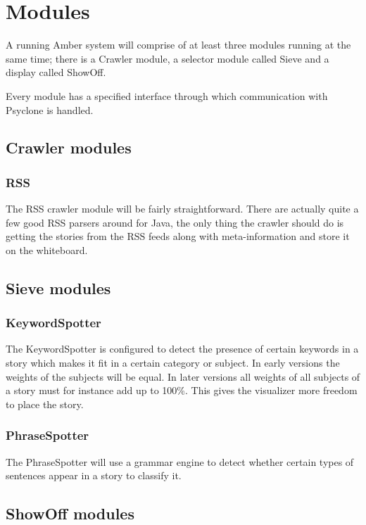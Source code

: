 \section{\label{sct:modules}Modules}

A running Amber system will comprise of at least three modules running at the
same time; there is a Crawler module, a selector module called Sieve and a
display called ShowOff.

Every module has a specified interface through which communication with
Psyclone is handled.

\subsection{Crawler modules}

\subsubsection{RSS}

The RSS crawler module will be fairly straightforward. There are actually quite
a few good RSS parsers around for Java, the only thing the crawler should do is
getting the stories from the RSS feeds along with meta-information and store it
on the whiteboard.

\subsection{Sieve modules}

\subsubsection{KeywordSpotter}

The KeywordSpotter is configured to detect the presence of certain keywords in
a story which makes it fit in a certain category or subject. In early versions
the weights of the subjects will be equal. In later versions all weights of all
subjects of a story must for instance add up to 100\%. This gives the
visualizer more freedom to place the story.

\subsubsection{PhraseSpotter}

The PhraseSpotter will use a grammar engine to detect whether certain types of
sentences appear in a story to classify it.

\subsection{ShowOff modules}

